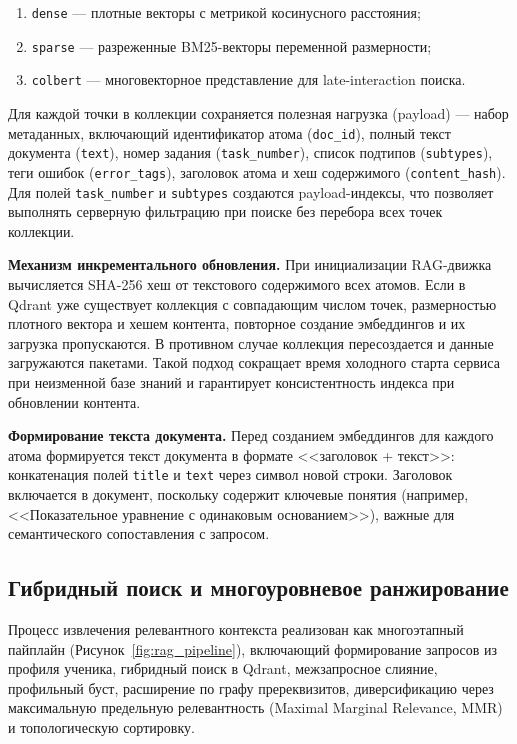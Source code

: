 \documentclass[a4paper,12pt]{extarticle}
\begin{document}
\begin{enumerate}
    \item \texttt{dense} --- плотные векторы с метрикой косинусного расстояния;
    \item \texttt{sparse} --- разреженные BM25-векторы переменной размерности;
    \item \texttt{colbert} --- многовекторное представление для late-interaction
	поиска.
\end{enumerate}

Для каждой точки в коллекции сохраняется полезная нагрузка (payload) --- набор метаданных, включающий
идентификатор атома (\texttt{doc\_id}), полный текст документа (\texttt{text}), номер задания
(\texttt{task\_number}), список подтипов (\texttt{subtypes}), теги ошибок
(\texttt{error\_tags}), заголовок атома и хеш содержимого (\texttt{content\_hash}).
Для полей \texttt{task\_number} и \texttt{subtypes} создаются payload-индексы,
что позволяет выполнять серверную фильтрацию при поиске без перебора всех
точек коллекции.

\textbf{Механизм инкрементального обновления.} При инициализации RAG-движка вычисляется
SHA-256 хеш от текстового содержимого всех атомов. Если в Qdrant уже существует
коллекция с совпадающим числом точек, размерностью плотного вектора и хешем контента,
повторное создание эмбеддингов и их загрузка пропускаются. В противном случае коллекция
пересоздается и данные загружаются пакетами. Такой подход сокращает время холодного
старта сервиса при неизменной базе знаний и гарантирует консистентность индекса
при обновлении контента.

\textbf{Формирование текста документа.} Перед созданием эмбеддингов для каждого атома
формируется текст документа в формате <<заголовок + текст>>: конкатенация полей
\texttt{title} и \texttt{text} через символ новой строки. Заголовок включается в
документ, поскольку содержит ключевые понятия (например, <<Показательное уравнение
с одинаковым основанием>>), важные для семантического сопоставления с запросом.

\subsection{Гибридный поиск и многоуровневое ранжирование}

Процесс извлечения релевантного контекста реализован как многоэтапный пайплайн
(Рисунок~\ref{fig:rag_pipeline}),
включающий формирование запросов из профиля ученика, гибридный поиск в Qdrant,
межзапросное слияние, профильный буст, расширение по графу пререквизитов,
диверсификацию через максимальную предельную релевантность 
(Maximal Marginal Relevance, MMR) и топологическую сортировку.
\end{document}
